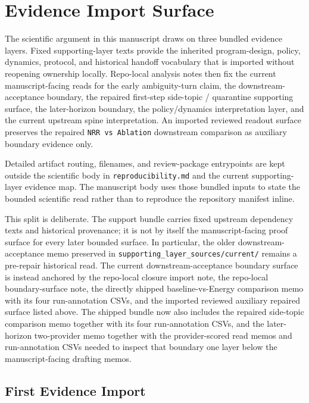 \documentclass[11pt]{article}
\begin{document}
\section{Evidence Import Surface}

The scientific argument in this manuscript draws on three bundled evidence
layers. Fixed supporting-layer texts provide the inherited program-design,
policy, dynamics, protocol, and historical handoff vocabulary that is imported
without reopening ownership locally. Repo-local analysis notes then fix the
current manuscript-facing reads for the early ambiguity-turn claim, the
downstream-acceptance boundary, the repaired first-step side-topic /
quarantine supporting surface, the later-horizon boundary, the
policy/dynamics interpretation layer, and the current upstream spine
interpretation. An imported reviewed readout surface preserves the repaired
\texttt{NRR vs Ablation} downstream comparison as auxiliary boundary evidence
only.

Detailed artifact routing, filenames, and review-package entrypoints are kept
outside the scientific body in \texttt{reproducibility.md} and the current
supporting-layer evidence map. The manuscript body uses those bundled inputs to
state the bounded scientific read rather than to reproduce the repository
manifest inline.

This split is deliberate. The support bundle carries fixed upstream dependency
texts and historical provenance; it is not by itself the manuscript-facing
proof surface for every later bounded surface. In particular, the older downstream-
acceptance memo preserved in \texttt{supporting\_layer\_sources/current/}
remains a pre-repair historical read. The current downstream-acceptance
boundary surface is instead anchored by the repo-local closure import note, the
repo-local boundary-surface note, the directly shipped baseline-vs-Energy
comparison memo with its four run-annotation CSVs, and the imported reviewed
auxiliary repaired surface listed above. The shipped bundle now also includes
the repaired side-topic comparison memo together with its four run-annotation
CSVs, and the later-horizon two-provider memo together with the provider-scored
read memos and run-annotation CSVs needed to inspect that boundary one layer
below the manuscript-facing drafting memos.

\subsection{First Evidence Import}
\end{document}
